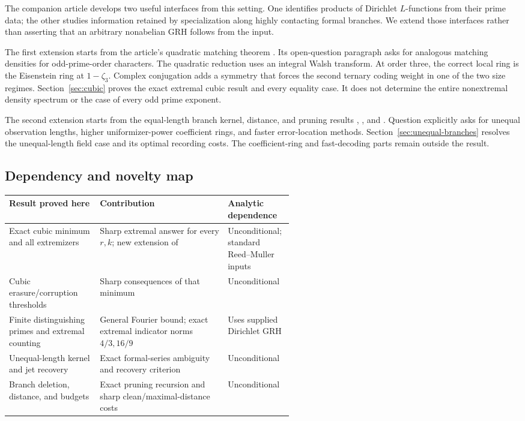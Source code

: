 The companion article develops two useful interfaces from this setting.
One identifies products of Dirichlet $L$-functions from their prime data;
the other studies information retained by specialization along highly
contacting formal branches. We extend those interfaces rather than
asserting that an arbitrary nonabelian GRH follows from the input.

The first extension starts from the article's quadratic matching theorem
. Its open-question paragraph asks for analogous
matching densities for odd-prime-order characters. The quadratic reduction
uses an integral Walsh transform. At order three, the correct local ring is
the Eisenstein ring at $1-\zeta_3$. Complex conjugation adds a symmetry that
forces the second ternary coding weight in one of the two size regimes.
Section~\ref{sec:cubic} proves the exact extremal cubic result and every
equality case. It does not determine the entire nonextremal density
spectrum or the case of every odd prime exponent.

The second extension starts from the equal-length branch kernel, distance,
and pruning results , , and
. Question  explicitly asks for
unequal observation lengths, higher uniformizer-power coefficient rings,
and faster error-location methods. Section~\ref{sec:unequal-branches}
resolves the unequal-length field case and its optimal recording costs.
The coefficient-ring and fast-decoding parts remain outside the result.

\subsection{Dependency and novelty map}

\begin{center}
\small
\begin{tabularx}{\linewidth}{@{}L{0.32\linewidth}YL{0.23\linewidth}@{}}
\toprule
Result proved here & Contribution & Analytic dependence\\
\midrule
Exact cubic minimum and all extremizers & Sharp extremal answer for every
$r,k$; new extension of  & Unconditional; standard
Reed--Muller inputs\\[4pt]
Cubic erasure/corruption thresholds & Sharp consequences of that minimum &
Unconditional\\[4pt]
Finite distinguishing primes and extremal counting & General Fourier bound;
exact extremal indicator norms $4/3,16/9$ & Uses supplied Dirichlet GRH\\[4pt]
Unequal-length kernel and jet recovery & Exact formal-series ambiguity and
recovery criterion & Unconditional\\[4pt]
Branch deletion, distance, and budgets & Exact pruning recursion and sharp
clean/maximal-distance costs & Unconditional\\
\bottomrule
\end{tabularx}
\end{center}

